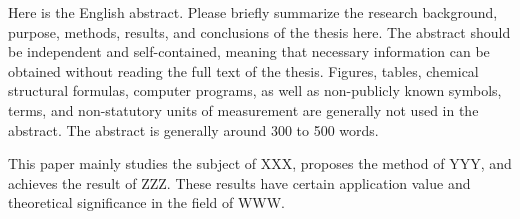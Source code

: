 
\begin{enabstract}
Here is the English abstract. Please briefly summarize the research background, purpose, methods, results, and conclusions of the thesis here. The abstract should be independent and self-contained, meaning that necessary information can be obtained without reading the full text of the thesis. Figures, tables, chemical structural formulas, computer programs, as well as non-publicly known symbols, terms, and non-statutory units of measurement are generally not used in the abstract. The abstract is generally around 300 to 500 words.

This paper mainly studies the subject of XXX, proposes the method of YYY, and achieves the result of ZZZ. These results have certain application value and theoretical significance in the field of WWW.

\end{enabstract}
